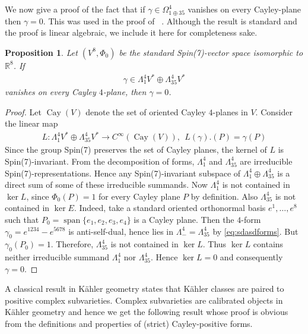 \documentclass[10pt,a4paper,reqno]{article}
\newtheorem{proposition}[theorem]{Proposition}
\theoremstyle{definition}
\numberwithin{equation}{section}
\def\bR{\mathbb R}
\begin{document}

We now give a proof of the fact that if $\gamma\in \Omega^4_{1\oplus 35}$ vanishes on every Cayley-plane then $\gamma=0$. This was used in the proof of ~. Although the result is standard and the proof is linear algebraic, we include it here for completeness sake. 

\begin{proposition}\label{prop:cayleyplanevanish}
Let $(V^8,\Phi_0)$ be the standard Spin(7)-vector space isomorphic to $\bR^8$. If
\begin{align*}
 \gamma\in \Lambda^4_1V^*\oplus \Lambda^4_{35}V^*   
\end{align*}
vanishes on every Cayley $4$-plane, then $\gamma=0$.    
\end{proposition}
\begin{proof} 
Let $\operatorname{Cay}(V)$ denote the set of oriented Cayley $4$-planes in $V$. Consider the linear map 
\begin{align*}
L:\Lambda^4_1V^*\oplus \Lambda^4_{35}V^*
\longrightarrow C^\infty(\operatorname{Cay}(V)),\ \ L(\gamma).(P)=\gamma(P)     
\end{align*} 
Since the group Spin(7) preserves the set of Cayley planes, the kernel of $L$ is Spin(7)-invariant. From the decomposition of forms,  $\Lambda^4_1$ and $\Lambda^4_{35}$ are irreducible Spin(7)-representations. Hence any Spin(7)-invariant subspace of $\Lambda^4_1\oplus \Lambda^4_{35}$ is a direct sum of some of these irreducible summands. Now $\Lambda^4_1$ is not contained in $\ker L$, since $\Phi_0(P)=1$ for every Cayley plane $P$ by definition. Also $\Lambda^4_{35}$ is not contained in $\ker E$. Indeed, take a standard oriented orthonormal basis $e^1,\ldots,e^8$ such that $P_0=\operatorname{span}\{e_1,e_2,e_3,e_4\}$ is a Cayley plane. Then the $4$-form $\gamma_0=e^{1234}-e^{5678}$ is anti-self-dual, hence lies in $\Lambda^4_-=\Lambda^4_{35}$ by \cref{eq:sdasdforms}. But $\gamma_0(P_0)=1.$ Therefore, $\Lambda^4_{35}$ is not contained in $\ker L$. Thus $\ker L$ contains neither irreducible summand $\Lambda^4_1$ nor $\Lambda^4_{35}$. Hence $\ker L=0$ and consequently $\gamma=0$. 
\end{proof}

A classical result in K\"ahler geometry states that K\"ahler classes are paired to positive complex subvarieties. Complex subvarieties are calibrated objects in K\"ahler geometry and hence we get the following result whose proof is obvious from the definitions and properties of (strict) Cayley-positive forms.
\end{document}
